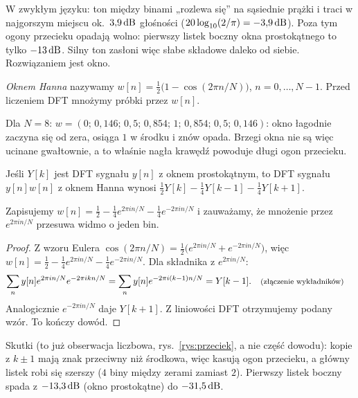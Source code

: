 W zwykłym języku: ton między binami „rozlewa się” na sąsiednie prążki i traci w najgorszym miejscu ok.\ $3{,}9\,\mathrm{dB}$ głośności ($20\log_{10}(2/\pi)=-3{,}9\,\mathrm{dB}$). Poza tym ogony przecieku opadają wolno: pierwszy listek boczny okna prostokątnego to tylko $-13\,\mathrm{dB}$.
Silny ton zasłoni więc słabe składowe daleko od siebie. Rozwiązaniem jest okno.

\begin{definicja}\label{def:hann}
\emph{Oknem Hanna} nazywamy $w[n]=\tfrac12\big(1-\cos(2\pi n/N)\big)$, $n=0,\dots,N-1$. Przed liczeniem DFT mnożymy próbki przez $w[n]$.
\end{definicja}

\begin{przyklad}\label{prz:hann}
Dla $N=8$: $w=(0;\,0{,}146;\,0{,}5;\,0{,}854;\,1;\,0{,}854;\,0{,}5;\,0{,}146)$: okno łagodnie zaczyna się od zera, osiąga $1$ w środku i znów opada.
Brzegi okna nie są więc ucinane gwałtownie, a to właśnie nagła krawędź powoduje długi ogon przecieku.
\end{przyklad}

\begin{twierdzenie}\label{tw:hann}
Jeśli $Y[k]$ jest DFT sygnału $y[n]$ z oknem prostokątnym, to DFT sygnału $y[n]w[n]$ z oknem Hanna wynosi
$\tfrac12Y[k]-\tfrac14Y[k-1]-\tfrac14Y[k+1]$.
\end{twierdzenie}
\begin{pomyslDowodu}
Zapisujemy $w[n]=\tfrac12-\tfrac14e^{2\pi in/N}-\tfrac14e^{-2\pi in/N}$ i zauważamy, że mnożenie przez $e^{2\pi in/N}$ przesuwa widmo o jeden bin.
\end{pomyslDowodu}
\begin{proof}
Z wzoru Eulera $\cos(2\pi n/N)=\tfrac12\big(e^{2\pi in/N}+e^{-2\pi in/N}\big)$, więc
$w[n]=\tfrac12-\tfrac14e^{2\pi in/N}-\tfrac14e^{-2\pi in/N}$. Dla składnika z $e^{2\pi in/N}$:
\begin{align*}
\sum_n y[n]e^{2\pi in/N}e^{-2\pi ikn/N} &= \sum_n y[n]e^{-2\pi i(k-1)n/N}=Y[k-1]. && \text{\footnotesize (złączenie wykładników)}
\end{align*}
Analogicznie $e^{-2\pi in/N}$ daje $Y[k+1]$. Z liniowości DFT otrzymujemy podany wzór. To kończy dowód.
\end{proof}

Skutki (to już obserwacja liczbowa, rys.~\ref{rys:przeciek}, a nie część dowodu): kopie z $k\pm1$ mają znak przeciwny niż środkowa, więc
kasują ogon przecieku, a główny listek robi się szerszy ($4$ biny między zerami zamiast $2$). Pierwszy listek boczny
spada z $-13{,}3\,\mathrm{dB}$ (okno prostokątne) do $-31{,}5\,\mathrm{dB}$.

